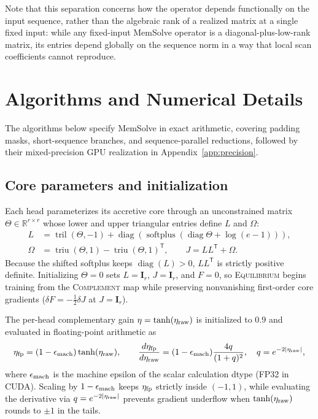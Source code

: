 \documentclass[10pt,twocolumn]{article}
\newcommand{\R}{\mathbb{R}}
\newcommand{\I}{\mathbf{I}}
\newcommand{\T}{\mathsf{T}}
\newcommand{\diag}{\operatorname{diag}}
\newcommand{\tril}{\operatorname{tril}}
\newcommand{\triu}{\operatorname{triu}}
\begin{document}
Note that this separation concerns how the operator depends functionally on
the input sequence, rather than the algebraic rank of a realized matrix at a
single fixed input: while any fixed-input MemSolve operator is a diagonal-plus-low-rank
matrix, its entries depend globally on the sequence norm in a way that local
scan coefficients cannot reproduce.

\section{Algorithms and Numerical Details}
\label{app:implementation}

The algorithms below specify MemSolve in exact arithmetic, covering padding
masks, short-sequence branches, and sequence-parallel reductions, followed by
their mixed-precision GPU realization in Appendix~\ref{app:precision}.

\subsection{Core parameters and initialization}
\label{app:parameters}

Each head parameterizes its accretive core through an unconstrained matrix
$\Theta\in\R^{r\times r}$ whose lower and upper triangular entries define
$L$ and $\Omega$:
\begin{align}
 L&=\tril(\Theta,-1)+\diag\!\left(
    \operatorname{softplus}(\diag\Theta+\log(e-1))\right),\\
 \Omega&=\triu(\Theta,1)-\triu(\Theta,1)^\T,\qquad J=LL^\T+\Omega.
 \label{eq:core-parameters}
\end{align}
Because the shifted softplus keeps $\diag(L)>0$, $LL^\T$ is strictly positive
definite. Initializing $\Theta=0$ sets $L=\I_r$, $J=\I_r$, and $F=0$, so
\textsc{Equilibrium} begins training from the \textsc{Complement} map while
preserving nonvanishing first-order core gradients ($\delta F=-\tfrac12\delta J$
at $J=\I_r$).

The per-head complementary gain $\eta=\tanh(\eta_{\rm raw})$ is initialized to
$0.9$ and evaluated in floating-point arithmetic as
\begin{equation}
 \eta_{\rm fp}=(1-\epsilon_{\rm mach})\tanh(\eta_{\rm raw}),\qquad
 \frac{d\eta_{\rm fp}}{d\eta_{\rm raw}}
 =(1-\epsilon_{\rm mach})\frac{4q}{(1+q)^2},\quad
 q=e^{-2|\eta_{\rm raw}|},
 \label{eq:eta-numerical}
\end{equation}
where $\epsilon_{\rm mach}$ is the machine epsilon of the scalar calculation
dtype (FP32 in CUDA).
Scaling by $1-\epsilon_{\rm mach}$ keeps $\eta_{\rm fp}$ strictly inside
$(-1,1)$, while evaluating the derivative via $q=e^{-2|\eta_{\rm raw}|}$
prevents gradient underflow when $\tanh(\eta_{\rm raw})$ rounds to $\pm1$ in
the tails.
\end{document}
